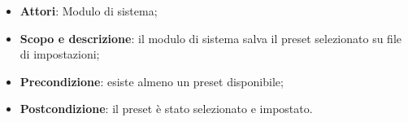 \begin{itemize}
\item \textbf{Attori}: Modulo di sistema;
\item \textbf{Scopo e descrizione}: il modulo di sistema salva il preset selezionato su file di impostazioni;
\item \textbf{Precondizione}: esiste almeno un preset disponibile;
\item \textbf{Postcondizione}: il preset è stato selezionato e impostato.
\end{itemize}